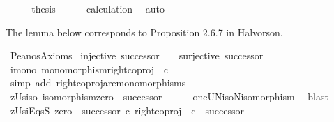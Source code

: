 \begin{isabellebody}
\ \ \isamarkupfalse%
\ \isamarkupfalse%
\ {\isacharquery}{\kern0pt}thesis\isanewline
\ \ \ \ \isamarkupfalse%
\ calculation\ \isamarkupfalse%
\ auto\isanewline
{}\isamarkupfalse%
%
\endisatagproof
{\isafoldproof}%
%
\isadelimproof
%
\endisadelimproof
%
\isadelimdocument
%
\endisadelimdocument
%
\isatagdocument
%
\isamarkuptrue%
%
\endisatagdocument
{\isafolddocument}%
%
\isadelimdocument
%
\endisadelimdocument
%
\begin{isamarkuptext}%
The lemma below corresponds to Proposition 2.6.7 in Halvorson.%
\end{isamarkuptext}\isamarkuptrue%
\isamarkupfalse%
\ Peano{\isacharprime}{\kern0pt}s{\isacharunderscore}{\kern0pt}Axioms{\isacharcolon}{\kern0pt}\isanewline
\ {\isachardoublequoteopen}injective\ successor\ \ {\isasymand}\ {\isasymnot}\ surjective\ successor{\isachardoublequoteclose}\isanewline
%
\isadelimproof
%
\endisadelimproof
%
\isatagproof
{}\isamarkupfalse%
\ {\isacharminus}{\kern0pt}\ \isanewline
\ \ \isamarkupfalse%
\ i{}{\isacharunderscore}{\kern0pt}mono{\isacharcolon}{\kern0pt}\ {\isachardoublequoteopen}monomorphism{\isacharparenleft}{\kern0pt}right{\isacharunderscore}{\kern0pt}coproj\ {\isasymone}\ {\isasymnat}\isactrlsub c{\isacharparenright}{\kern0pt}{\isachardoublequoteclose}\isanewline
\ \ \ \ \isamarkupfalse%
\ {\isacharparenleft}{\kern0pt}simp\ add{\isacharcolon}{\kern0pt}\ right{\isacharunderscore}{\kern0pt}coproj{\isacharunderscore}{\kern0pt}are{\isacharunderscore}{\kern0pt}monomorphisms{\isacharparenright}{\kern0pt}\isanewline
\ \ \isamarkupfalse%
\ zUs{\isacharunderscore}{\kern0pt}iso{\isacharcolon}{\kern0pt}\ {\isachardoublequoteopen}isomorphism{\isacharparenleft}{\kern0pt}zero\ {\isasymamalg}\ successor{\isacharparenright}{\kern0pt}{\isachardoublequoteclose}\isanewline
\ \ \ \ \isamarkupfalse%
\ oneUN{\isacharunderscore}{\kern0pt}iso{\isacharunderscore}{\kern0pt}N{\isacharunderscore}{\kern0pt}isomorphism\ \isamarkupfalse%
\ blast\isanewline
\ \ \isamarkupfalse%
\ zUsi{}EqsS{\isacharcolon}{\kern0pt}\ {\isachardoublequoteopen}{\isacharparenleft}{\kern0pt}zero\ {\isasymamalg}\ successor{\isacharparenright}{\kern0pt}\ {\isasymcirc}\isactrlsub c\ {\isacharparenleft}{\kern0pt}right{\isacharunderscore}{\kern0pt}coproj\ {\isasymone}\ {\isasymnat}\isactrlsub c{\isacharparenright}{\kern0pt}\ {\isacharequal}{\kern0pt}\ successor{\isachardoublequoteclose}\isanewline

\end{isabellebody}
